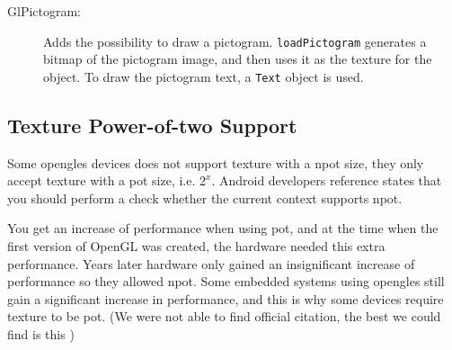 \begin{description}
\item[GlPictogram:] Adds the possibility to draw a pictogram. \lstinline|loadPictogram| generates a bitmap of the pictogram image, and then uses it as the texture for the object. To draw the pictogram text, a \lstinline|Text| object is used.
\end{description}

\subsection{Texture Power-of-two Support}\label{sec:potsupport}
Some \ac{opengles} devices does not support texture with a \ac{npot} size, they only accept texture with a \ac{pot} size, i.e. $2^x$. Android developers reference states that you should perform a check whether the current context supports \ac{npot}. \citep{glutils}

You get an increase of performance when using \ac{pot}, and at the time when the first version of OpenGL was created, the hardware needed this extra performance. Years later hardware only gained an insignificant increase of performance so they allowed \ac{npot}. Some embedded systems using \ac{opengles} still gain a significant increase in performance, and this is why some devices require texture to be \ac{pot}. (We were not able to find official citation, the best we could find is this \citep{potperformance})

